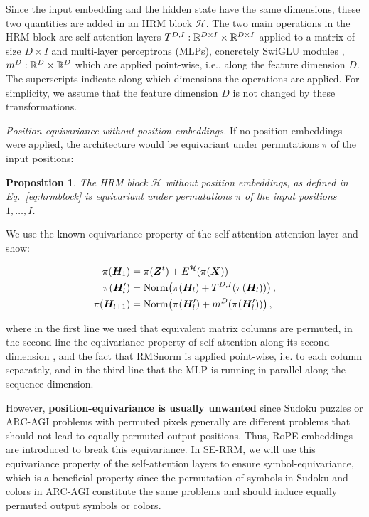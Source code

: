 \documentclass{article}
\theoremstyle{plain}
\newtheorem{proposition}[theorem]{Proposition}
\theoremstyle{definition}
\theoremstyle{remark}
\begin{document}
Since the input embedding and the hidden state have the same dimensions, these two quantities are added in an HRM block $\mathcal H$. The two main operations in the HRM block are self-attention layers $T^{D,I}: \mathbb{R}^{D \times I} \times \mathbb{R}^{D \times I}$ applied to a matrix of size $D \times I$ and multi-layer perceptrons (MLPs), concretely SwiGLU modules \citep{shazeer2020glu}, $m^{D}:\mathbb{R}^{D} \times \mathbb{R}^{D}$ which are applied point-wise, i.e., along the feature dimension $D$. The superscripts indicate along which dimensions the operations are applied. 
For simplicity, we assume that the feature dimension $D$ is not changed by these transformations.

\emph{Position-equivariance without position embeddings.}
If no position embeddings were applied, the architecture would be equivariant under permutations $\pi$ of the input positions:

\begin{proposition}
    The HRM block $\mathcal H$ without position embeddings, as defined in Eq.~\eqref{eq:hrmblock} is equivariant under permutations $\pi$ of the input positions $1,\ldots,I$. 
\end{proposition}

We use the known equivariance property of the self-attention attention layer \citep{ilse2018attention,lee2019set} and show:


\begin{align} \label{eq:hrmblock}
    \pi(\bm{H}_1) &= \pi(\bm{Z}^t) + E^{\mathcal H}(\pi(\bm{X})) \\
    \pi(\bm{H}'_{l}) &= \text{Norm}\!\left(
        \pi(\bm{H}_{l}) + T^{D,I}(\pi(\bm{H}_{l}))
    \right), \\
    \pi(\bm{H}_{l+1}) &= \text{Norm}\!\left(
        \pi(\bm{H}'_{l}) + m^{D}(\pi(\bm{H}'_{l}))
    \right),
\end{align}

where in the first line we used that equivalent
matrix columns are permuted,
in the second line the equivariance property 
of self-attention along its second dimension \citep{xu2024permutation}, 
and the fact
that RMSnorm is applied point-wise, 
i.e. to each column separately,
and in the third line that the MLP is running in parallel
along the sequence dimension.

However, \textbf{position-equivariance is usually unwanted} since Sudoku puzzles or ARC-AGI problems with permuted pixels generally are different problems that should not lead to equally permuted output positions. Thus, RoPE embeddings are introduced to break this equivariance. In SE-RRM, we will use this equivariance property of the self-attention layers to ensure symbol-equivariance, which is a beneficial property since the permutation of symbols in Sudoku and colors in ARC-AGI constitute the same problems and should induce equally permuted output symbols or colors.
\end{document}
